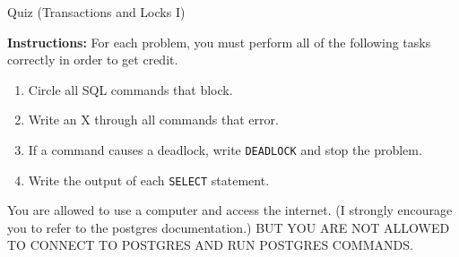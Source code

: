 \documentclass[10pt]{article}
\theoremstyle{definition}
\newcounter{ProblemCounter}
\newcommand{\nextproblem}{\filbreak\stepcounter{ProblemCounter} \noindent\textbf{Problem \theProblemCounter}:}
\begin{document}
\begin{center}
{
\Large
    Quiz (Transactions and Locks I)
}

    \vspace{0.1in}
\end{center}

\noindent
\textbf{Instructions:}
For each problem, you must perform all of the following tasks correctly in order to get credit.
\begin{enumerate}
\item Circle all SQL commands that block.
\item Write an X through all commands that error.
\item If a command causes a deadlock, write \lstinline{DEADLOCK} and stop the problem.
\item Write the output of each \lstinline{SELECT} statement.
\end{enumerate}
You are allowed to use a computer and access the internet.
(I strongly encourage you to refer to the postgres documentation.)
BUT YOU ARE NOT ALLOWED TO CONNECT TO POSTGRES AND RUN POSTGRES COMMANDS.

\vspace{1in}

%
%
%
%
%
%
%
%
%
%
%
%
%
%
%
\end{document}
